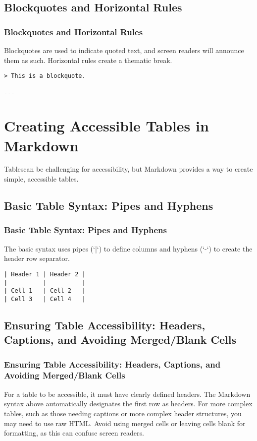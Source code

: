\subsection{Blockquotes and Horizontal Rules}
\label{subsec:markdown-blockquotes-rules}
\subsubsection{Blockquotes and Horizontal Rules}
\label{ssubsec:markdown-blockquotes-rules-details}
Blockquotes are used to indicate quoted text, and screen readers will announce them as such. Horizontal rules create a thematic break.
\begin{verbatim}
> This is a blockquote.

---
\end{verbatim}

\section{Creating Accessible Tables in Markdown}
\label{sec:accessible-markdown-tables}
Tablescan be challenging for accessibility, but Markdown provides a way to create simple, accessible tables.

\subsection{Basic Table Syntax: Pipes and Hyphens}
\label{subsec:markdown-table-syntax}
\subsubsection{Basic Table Syntax: Pipes and Hyphens}
\label{ssubsec:markdown-table-syntax-details}
The basic syntax uses pipes (`|`) to define columns and hyphens (`-`) to create the header row separator.
\begin{verbatim}
| Header 1 | Header 2 |
|----------|----------|
| Cell 1   | Cell 2   |
| Cell 3   | Cell 4   |
\end{verbatim}

\subsection{Ensuring Table Accessibility: Headers, Captions, and Avoiding Merged/Blank Cells}
\label{subsec:markdown-table-accessibility}
\subsubsection{Ensuring Table Accessibility: Headers, Captions, and Avoiding Merged/Blank Cells}
\label{ssubsec:markdown-table-accessibility-details}
For a table to be accessible, it must have clearly defined headers. The Markdown syntax above automatically designates the first row as headers. For more complex tables, such as those needing captions or more complex header structures, you may need to use raw HTML. Avoid using merged cells or leaving cells blank for formatting, as this can confuse screen readers.

